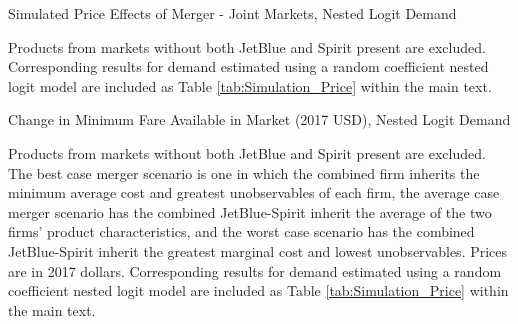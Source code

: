 \documentclass{article}
\begin{document}
\begin{appendices}
      \begin{table}
        \caption{Simulated Price Effects of Merger - Joint Markets, Nested Logit Demand}
        \label{tab:Simulation_Price_NestedLogit}
                \vspace{-15mm}
        \begin{center}
         
        \end{center}
        \vspace{-5mm}
        \footnotesize{Products from markets without both JetBlue and Spirit present are excluded. Corresponding results for demand estimated using a random coefficient nested logit model are included as Table \ref{tab:Simulation_Price} within the main text.}

     \end{table}

 \begin{table}
        \caption{Change in Minimum Fare Available in Market (2017 USD), Nested Logit Demand}
        \label{tab:MinimumPrice_NestedLogit}
                \vspace{-15mm}
        \begin{center}
            
        \end{center}
        \vspace{-5mm}
        \footnotesize{Products from markets without both JetBlue and Spirit present are excluded. The best case merger scenario is one in which the combined firm inherits the minimum average cost and greatest unobservables of each firm, the average case merger scenario has the combined JetBlue-Spirit inherit the average of the two firms' product characteristics, and the worst case scenario has the combined JetBlue-Spirit inherit the greatest marginal cost and lowest unobservables. Prices are in 2017 dollars. Corresponding results for demand estimated using a random coefficient nested logit model are included as Table \ref{tab:Simulation_Price} within the main text.}
    \end{table}    
\FloatBarrier



\end{appendices}
	
\end{document}
